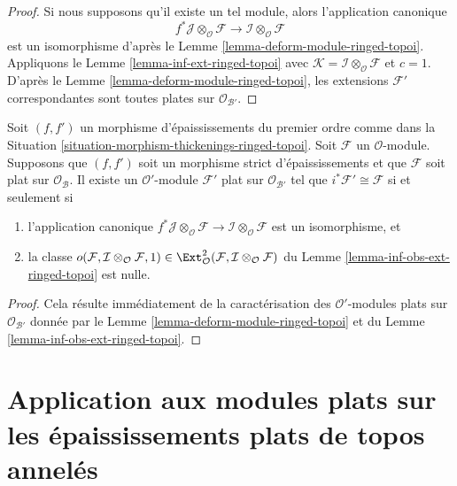 \begin{proof}
Si nous supposons qu'il existe un tel module, alors l'application canonique
$$
f^*\mathcal{J} \otimes_\mathcal{O} \mathcal{F} \to
\mathcal{I} \otimes_\mathcal{O} \mathcal{F}
$$
est un isomorphisme d'après le
Lemme \ref{lemma-deform-module-ringed-topoi}. Appliquons le
Lemme \ref{lemma-inf-ext-ringed-topoi} avec $\mathcal{K} = 
\mathcal{I} \otimes_\mathcal{O} \mathcal{F}$ et $c = 1$.
D'après le Lemme \ref{lemma-deform-module-ringed-topoi}, les extensions
$\mathcal{F}'$ correspondantes sont toutes plates sur
$\mathcal{O}_{\mathcal{B}'}$.
\end{proof}

\begin{lemma}
\label{lemma-inf-obs-ext-rel-ringed-topoi}
Soit $(f, f')$ un morphisme d'épaississements du premier ordre comme dans la
Situation \ref{situation-morphism-thickenings-ringed-topoi}.
Soit $\mathcal{F}$ un $\mathcal{O}$-module. Supposons que $(f, f')$ soit un
morphisme strict d'épaississements et que $\mathcal{F}$ soit plat sur
$\mathcal{O}_\mathcal{B}$. Il existe un $\mathcal{O}'$-module $\mathcal{F}'$
plat sur $\mathcal{O}_{\mathcal{B}'}$ tel que
$i^*\mathcal{F}' \cong \mathcal{F}$ si et seulement si
\begin{enumerate}
\item l'application canonique
$f^*\mathcal{J} \otimes_\mathcal{O} \mathcal{F} \to
\mathcal{I} \otimes_\mathcal{O} \mathcal{F}$
est un isomorphisme, et
\item la classe
$o(\mathcal{F}, \mathcal{I} \otimes_\mathcal{O} \mathcal{F}, 1)
\in \Ext^2_\mathcal{O}(
\mathcal{F}, \mathcal{I} \otimes_\mathcal{O} \mathcal{F})$
du Lemme \ref{lemma-inf-obs-ext-ringed-topoi} est nulle.
\end{enumerate}
\end{lemma}

\begin{proof}
Cela résulte immédiatement de la caractérisation des $\mathcal{O}'$-modules
plats sur $\mathcal{O}_{\mathcal{B}'}$ donnée par le
Lemme \ref{lemma-deform-module-ringed-topoi} et du
Lemme \ref{lemma-inf-obs-ext-ringed-topoi}.
\end{proof}

\section{Application aux modules plats sur les épaississements plats de topos annelés}
\label{section-flat-ringed-topoi}


